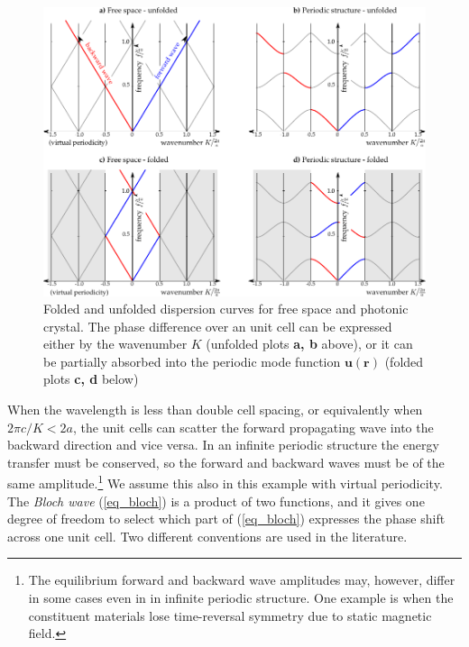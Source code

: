 \documentclass[letterpaper,12pt]{report}
\begin{document}
\begin{figure}[ht] \caption{Folded and unfolded dispersion curves for free space and photonic crystal. The phase difference over an unit cell can be expressed either by the wavenumber $K$ (unfolded plots \textbf{a, b} above), or it can be partially absorbed into the periodic mode function $\mathbf{u}(\mathbf{r})$ (folded plots \textbf{c, d} below) } \label{fg_phc} \centering  %
	\includegraphics[width=17cm]{img/PhC_folding_illustration.pdf} 
\end{figure}
When the wavelength is less than double cell spacing, or equivalently when $2\pi c /K < 2 a$, the unit cells can scatter the forward propagating wave into the backward direction and vice versa. In an infinite periodic structure the energy transfer must be conserved, so the forward and backward waves must be of the same amplitude.\footnote{The equilibrium forward and backward wave amplitudes may, however, differ in some cases even in in infinite periodic structure. One example is when the constituent materials lose time-reversal symmetry due to static magnetic field.} We assume this also in this example with virtual periodicity. The \textit{Bloch wave} (\ref{eq_bloch}) is a product of two functions, and it gives one degree of freedom to select which part of (\ref{eq_bloch}) expresses the phase shift across one unit cell. Two different conventions are used in the literature.
\end{document}

